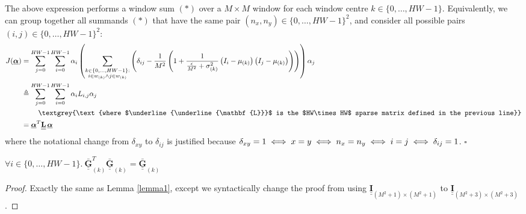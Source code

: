 \documentclass{article}
\def\vts#1{\underline{\boldsymbol{#1}}}
\def\mt#1{\underline{\underline{\mathbf{#1}}}}
\begin{document}
The above expression performs a window sum $(*)$ over a $M\times M$ window for each window centre $k\in\{0,\dots,HW-1\}$. Equivalently, we can group together all summands $(*)$ that have the same pair $(n_x,n_y)\in\{0,\dots,HW-1\}^2$, and consider all possible pairs $(i,j)\in\{0,\dots,HW-1\}^2$:
\begin{align*}
    J(\vts\alpha) &= \sum_{j=0}^{HW-1} \sum_{i=0}^{HW-1} \alpha_i \left(\sum_{\substack{k\in\{0,\dots,HW-1\}:\\i\in w_{(k)}\wedge j\in w_{(k)}}} \left( \delta_{ij} - \frac1{M^2}\left(1 + \frac1{\frac\epsilon{M^2} + \sigma_{(k)}^2} \left({I}_{i} - \mu_{(k)}\right) \left({I}_{j} - \mu_{(k)}\right) \right) \right)\right) \alpha_j\\
    &\triangleq \sum_{j=0}^{HW-1} \sum_{i=0}^{HW-1} \alpha_i L_{i,j} \alpha_j\\
    &\quad\quad\ \textgrey{\text{where $\mt L$ is the $HW\times HW$ sparse matrix defined in the previous line}}\\
    &= \vts \alpha^T \mt L\, \vts \alpha
\end{align*}
where the notational change from $\delta_{xy}$ to $\delta_{ij}$ is justified because $\delta_{xy} = 1 \iff x=y \iff n_x = n_y \iff i = j\\ \iff \delta_{ij}=1$. \hfill$\square$


\begin{lemma}\label{lemma3}
    $\forall i\in\{0,\dots,HW-1\}.\ \mt{\bar{G}}_{(k)}^T \mt{\bar{G}}_{(k)} = \mt{\bar{G}}_{(k)}$
    \begin{proof}
        Exactly the same as Lemma \ref{lemma1}, except we syntactically change the proof from using $\mt I_{(M^2+1)\times(M^2+1)}$ to $\mt I_{(M^2+3)\times(M^2+3)}$.
    \end{proof}
\end{lemma}
\end{document}
